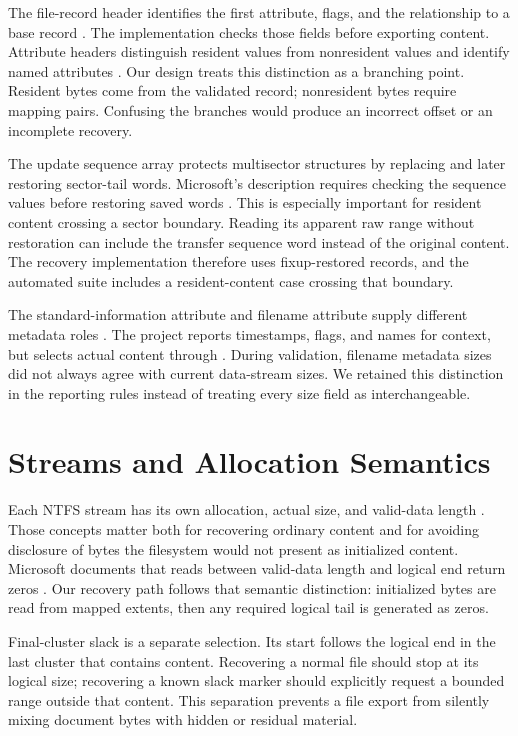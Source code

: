 The file-record header identifies the first attribute, flags, and the
relationship to a base record \cite{record}. The implementation checks those
fields before exporting content. Attribute headers distinguish resident
values from nonresident values and identify named attributes \cite{attribute}.
Our design treats this distinction as a branching point. Resident bytes
come from the validated record; nonresident bytes require mapping pairs.
Confusing the branches would produce an incorrect offset or an incomplete
recovery.

The update sequence array protects multisector structures by replacing and
later restoring sector-tail words. Microsoft's description requires checking
the sequence values before restoring saved words \cite{usa}. This is
especially important for resident content crossing a sector boundary.
Reading its apparent raw range without restoration can include the transfer
sequence word instead of the original content. The recovery implementation
therefore uses fixup-restored records, and the automated suite includes
a resident-content case crossing that boundary.

The standard-information attribute and filename attribute supply different
metadata roles \cite{standard,filename}. The project reports timestamps,
flags, and names for context, but selects actual content through
. During validation, filename metadata sizes did not always
agree with current data-stream sizes. We retained this distinction in the
reporting rules instead of treating every size field as interchangeable.

\section{Streams and Allocation Semantics}
Each NTFS stream has its own allocation, actual size, and valid-data length
\cite{streams}. Those concepts matter both for recovering ordinary content
and for avoiding disclosure of bytes the filesystem would not present as
initialized content. Microsoft documents that reads between valid-data
length and logical end return zeros \cite{fsutilfile}. Our recovery path
follows that semantic distinction: initialized bytes are read from mapped
extents, then any required logical tail is generated as zeros.

Final-cluster slack is a separate selection. Its start follows the logical
end in the last cluster that contains content. Recovering a normal file
should stop at its logical size; recovering a known slack marker should
explicitly request a bounded range outside that content. This separation
prevents a file export from silently mixing document bytes with hidden or
residual material.

